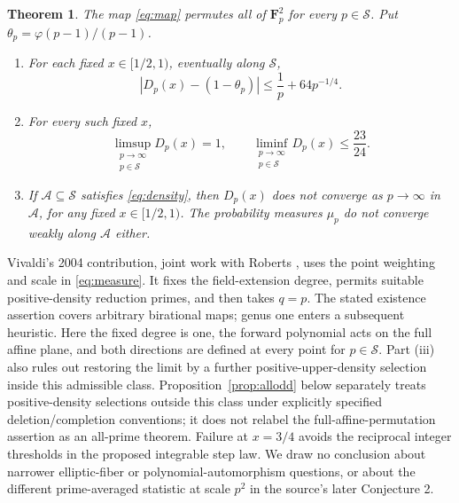 \documentclass[11pt]{article}
\newtheorem{theorem}{Theorem}
\theoremstyle{remark}
\newcommand{\Fp}{\mathbf F_p}
\begin{document}
\begin{theorem}\label{thm:main}
The map \eqref{eq:map} permutes all of $\Fp^2$ for every $p\in\mathcal S$.
Put $\theta_p=\varphi(p-1)/(p-1)$.
\par
\begin{enumerate}
\item For each fixed $x\in[1/2,1)$, eventually along $\mathcal S$,
\begin{equation}\label{eq:error}
 \left|D_p(x)-(1-\theta_p)\right|
       \le \frac1p+64p^{-1/4}.
\end{equation}
\item For every such fixed $x$,
\begin{equation}\label{eq:gap}
 \limsup_{\substack{p\to\infty\\p\in\mathcal S}}D_p(x)=1,
 \qquad
 \liminf_{\substack{p\to\infty\\p\in\mathcal S}}D_p(x)\le\frac{23}{24}.
\end{equation}
\item If $\mathcal A\subseteq\mathcal S$ satisfies \eqref{eq:density},
then $D_p(x)$ does not converge as $p\to\infty$ in $\mathcal A$, for any
fixed $x\in[1/2,1)$. The probability measures $\mu_p$ do not converge
weakly along $\mathcal A$ either.
\end{enumerate}
\end{theorem}

Vivaldi's 2004 contribution, joint work with Roberts
\cite[pp.2944--2945, Conjecture 1]{V}, uses the point weighting and scale
in \eqref{eq:measure}. It fixes the field-extension degree, permits
suitable positive-density reduction primes, and then takes $q=p$.
The stated existence assertion covers arbitrary birational maps;
genus one enters a subsequent heuristic. Here the fixed degree is one,
the forward polynomial acts on the full affine plane, and both directions
are defined at every point for $p\in\mathcal S$. Part (iii) also rules
out restoring the limit by a further positive-upper-density selection
inside this admissible class. Proposition~\ref{prop:allodd} below separately
treats positive-density selections outside this class under explicitly
specified deletion/completion conventions; it does not relabel the
full-affine-permutation assertion as an all-prime theorem. Failure at $x=3/4$ avoids the reciprocal
integer thresholds in the proposed integrable step law. We draw no
conclusion about narrower elliptic-fiber or polynomial-automorphism
questions, or about the different prime-averaged statistic at scale $p^2$
in the source's later Conjecture 2.
\end{document}
